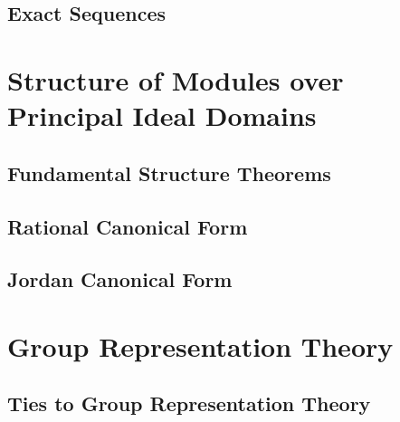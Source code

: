 \documentclass{memoir}
\begin{document}


\section{Exact Sequences}
\label{sec:exact_sequences}



\chapter{Structure of Modules over Principal Ideal Domains}
\label{cha:structure_of_modules_over_principal_ideal_domains}

\section{Fundamental Structure Theorems}
\label{sec:fundamental_structure_theorems}



\section{Rational Canonical Form}
\label{sec:rational_canonical_form}




\section{Jordan Canonical Form}
\label{sec:jordan_canonical_form}



\chapter{Group Representation Theory}
\label{cha:group_representation_theory}

\section{Ties to Group Representation Theory}
\label{sec:ties_to_group_representation_theory}








\end{document}
